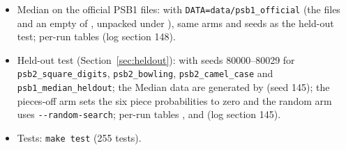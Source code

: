 \documentclass[sigconf,nonacm]{acmart}
\begin{document}
\begin{itemize}
  \item Median on the official PSB1 files:  with \texttt{DATA=data/psb1\_official} (the files  and an empty  of , unpacked under ), same arms and seeds as the held-out test; per-run tables  (log section 148).
  \item Held-out test (Section~\ref{sec:heldout}):  with seeds 80000--80029 for \texttt{psb2\_square\_digits}, \texttt{psb2\_bowling}, \texttt{psb2\_camel\_case} and \texttt{psb1\_median\_heldout}; the Median data are generated by  (seed 145); the pieces-off arm sets the six piece probabilities to zero and the random arm uses \texttt{-{}-random-search}; per-run tables ,  and  (log section 145).
  \item Tests: \texttt{make test} (255 tests).
\end{itemize}
\end{document}
